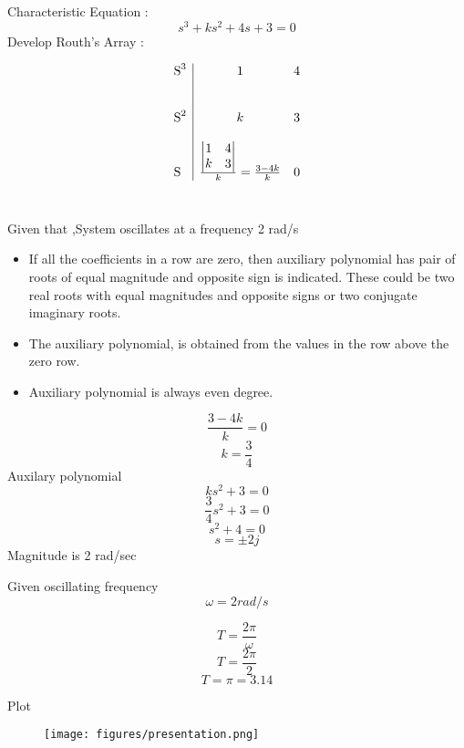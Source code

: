 \documentclass{beamer}
\begin{document}
\begin{frame}
Characteristic Equation :\\
$$s^3+ks^2+4s+3 = 0$$
Develop Routh's Array :\\
\begin{centre}
\[ \begin{array}{l|c  r}

\mbox S^3 & 1 & 4 \\~\\~\\
\mbox S^2 & k & 3 \\~\\
\mbox S & \frac{\begin{vmatrix}
1 & 4 \\ 
k & 3 \\  
\end{vmatrix}}{k} = \frac{3 - 4k}{k} & 0 \end{array}\] 
\\
\end{centre}
\end{frame}
\begin{frame}
 Given that ,System oscillates at a frequency 2 rad/s \\
\begin{itemize}

   \item If all the coefficients in a row are zero, then auxiliary polynomial has pair of roots of equal magnitude and opposite sign is indicated. These could be two real roots with equal magnitudes and opposite signs or two conjugate imaginary roots.
   \item The auxiliary polynomial, is obtained from the values in the row above the zero row.
   \item Auxiliary polynomial is always even degree.
\end{itemize}

\end{frame}
\begin{frame}
\begin{centre}

$$
\frac{3 - 4k}{k} = 0
$$
$$ k = \frac{3}{4}$$
Auxilary polynomial\\
$$
 ks^2 +3 = 0
$$
$$
 \frac{3}{4}s^2 +3 = 0
$$
$$
 s^2 + 4 =0 
$$
$$  s = \pm 2j$$
Magnitude is 2 rad/sec 


\end{centre}
    
\end{frame}
\begin{frame}
\begin{centre}


Given oscillating frequency $$\omega = 2 rad/s$$ 

$$ T = \frac{2\pi}{\omega}$$
$$T = \frac{2\pi}{2}$$
$$
 T = \pi = 3.14 
$$




\end{centre}
    
\end{frame}
\begin{frame}{Plot}
\begin{figure}
    \texttt{[image: figures/presentation.png]}
    
\end{figure}
    
\end{frame}
\end{document}
